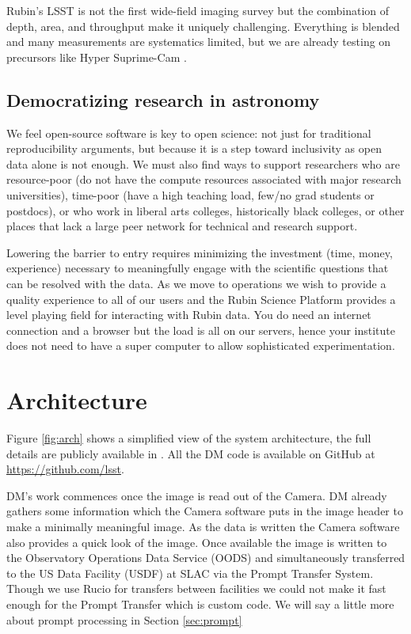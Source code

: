 \documentclass[11pt,twoside]{article}
\begin{document}
Rubin's LSST is not the first wide-field imaging survey but the combination of depth, area, and throughput make it uniquely challenging.
Everything is blended and many measurements are systematics limited, but
we are already testing  on precursors like Hyper Suprime-Cam \citep[HSC;][]{2018PASJ...70S...5B}.


\subsection{Democratizing research in astronomy}

We feel open-source software is key to open science: not just for traditional reproducibility arguments, but because it is a step toward inclusivity as
open data alone is not enough.
We must also find ways to support researchers who are resource-poor (do not have the compute resources associated with major research universities), time-poor (have a high teaching load, few/no grad students or postdocs), or who work in liberal arts colleges, historically black colleges, or other places that lack a large peer network for technical and research support.

Lowering the barrier to entry requires minimizing the investment (time, money, experience) necessary to meaningfully engage with the scientific questions that can be resolved with the data.
As we move to operations we wish to provide a quality experience to all of our users and the Rubin Science Platform provides a level playing field for interacting with Rubin data.
You do need an internet connection and a browser but the load is all on our servers, hence your institute does not need to have a super computer to allow sophisticated experimentation.

\section{Architecture}

Figure \ref{fig:arch} shows a simplified view of the system architecture, the full details are publicly available in \citep{LDM-148}. All the DM code is available on GitHub at \url{https://github.com/lsst}.

\begin{centering}
\end{centering}

DM's work commences once the image is read out of the Camera. DM already gathers some information which the Camera software puts in the image header to make a minimally meaningful image.
As the data is written the Camera software also provides a quick look  of the image.
Once available the image is written to the Observatory Operations Data Service (OODS) and simultaneously transferred to the US Data Facility (USDF) at SLAC via the Prompt Transfer System. Though we use Rucio for transfers between facilities we could not make it fast enough for the Prompt Transfer which is custom code.
We will say a little more about prompt processing in Section \ref{sec:prompt}
\end{document}
